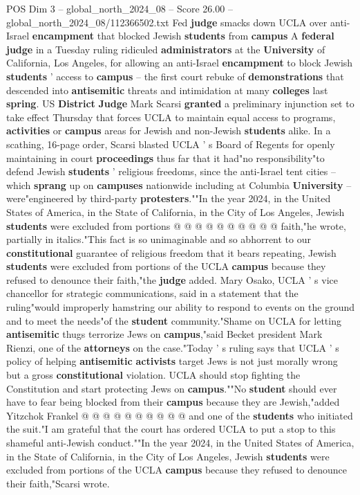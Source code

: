 \begin{textsample}{POS Dim 3 – global\_north\_2024\_08 – Score 26.00 – global\_north\_2024\_08/112366502.txt}  \label{ex:f3_pos_139}
Fed \textbf{judge} smacks down UCLA over anti-Israel \textbf{encampment} that blocked Jewish \textbf{students} from \textbf{campus} A \textbf{federal} \textbf{judge} in a Tuesday ruling ridiculed \textbf{administrators} at the \textbf{University} of California, Los Angeles, for allowing an anti-Israel \textbf{encampment} to block Jewish \textbf{students} ' access to \textbf{campus} -- the first court rebuke of \textbf{demonstrations} that descended into \textbf{antisemitic} threats and intimidation at many \textbf{colleges} last \textbf{spring}.
US \textbf{District} \textbf{Judge} Mark Scarsi \textbf{granted} a preliminary injunction set to take effect Thursday that forces UCLA to maintain equal access to programs, \textbf{activities} or \textbf{campus} areas for Jewish and non-Jewish \textbf{students} alike.
In a scathing, 16-page order, Scarsi blasted UCLA ' s Board of Regents for openly maintaining in court \textbf{proceedings} thus far that it had"no responsibility"to defend Jewish \textbf{students} ' religious freedoms, since the anti-Israel tent cities -- which \textbf{sprang} up on \textbf{campuses} nationwide including at Columbia \textbf{University} -- were"engineered by third-party \textbf{protesters}.""In the year 2024, in the United States of America, in the State of California, in the City of Los Angeles, Jewish \textbf{students} were excluded from portions @ @ @ @ @ @ @ @ @ @ faith,"he wrote, partially in italics."This fact is so unimaginable and so abhorrent to our \textbf{constitutional} guarantee of religious freedom that it bears repeating, Jewish \textbf{students} were excluded from portions of the UCLA \textbf{campus} because they refused to denounce their faith,"the \textbf{judge} added.
Mary Osako, UCLA ' s vice chancellor for strategic communications, said in a statement that the ruling"would improperly hamstring our ability to respond to events on the ground and to meet the needs"of the \textbf{student} community."Shame on UCLA for letting \textbf{antisemitic} thugs terrorize Jews on \textbf{campus},"said Becket president Mark Rienzi, one of the \textbf{attorneys} on the case."Today ' s ruling says that UCLA ' s policy of helping \textbf{antisemitic} \textbf{activists} target Jews is not just morally wrong but a gross \textbf{constitutional} violation.
UCLA should stop fighting the Constitution and start protecting Jews on \textbf{campus}.""No \textbf{student} should ever have to fear being blocked from their \textbf{campus} because they are Jewish,"added Yitzchok Frankel @ @ @ @ @ @ @ @ @ @ and one of the \textbf{students} who initiated the suit."I am grateful that the court has ordered UCLA to put a stop to this shameful anti-Jewish conduct.""In the year 2024, in the United States of America, in the State of California, in the City of Los Angeles, Jewish \textbf{students} were excluded from portions of the UCLA \textbf{campus} because they refused to denounce their faith,"Scarsi wrote.

\end{textsample}
